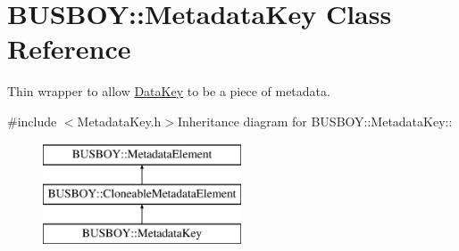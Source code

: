 \hypertarget{classBUSBOY_1_1MetadataKey}{
\section{BUSBOY::MetadataKey Class Reference}
\label{classBUSBOY_1_1MetadataKey}
}


Thin wrapper to allow \hyperlink{classBUSBOY_1_1DataKey}{DataKey} to be a piece of metadata.  


{\ttfamily \#include $<$MetadataKey.h$>$}Inheritance diagram for BUSBOY::MetadataKey::\begin{figure}[H]
\begin{center}
\leavevmode
\includegraphics[height=3cm]{classBUSBOY_1_1MetadataKey}
\end{center}
\end{figure}
